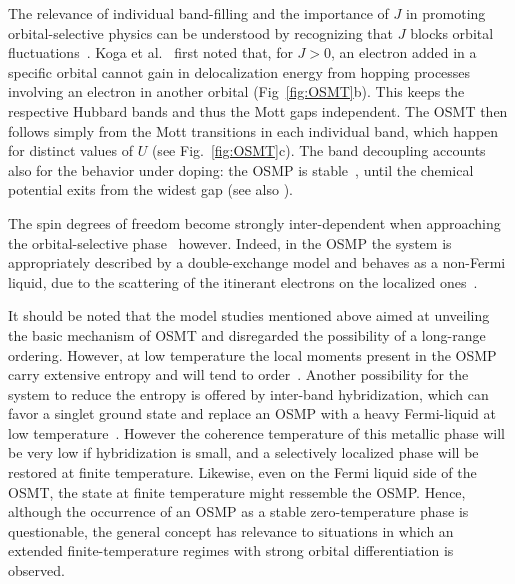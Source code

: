 \documentclass[]{ar2e-changed}%
\begin{document}
The relevance of individual band-filling and the importance of $J$ in promoting orbital-selective physics can be understood by recognizing that 
$J$ blocks orbital fluctuations~\cite{Koga_OSMT,Koga_OSMT_2005,demedici_3bandOSMT}. 
Koga et al.~\cite{Koga_OSMT,Koga_OSMT_2005} first noted that, for $J>0$, 
an electron added in a specific orbital cannot gain in delocalization energy
from hopping processes involving an electron in another orbital 
(Fig~\ref{fig:OSMT}b). This keeps the respective Hubbard bands and thus the Mott gaps independent. 
The OSMT then follows simply from the Mott
transitions in each individual band, which happen for distinct values of $U$ (see Fig.~\ref{fig:OSMT}c). 
%
The band decoupling accounts also for the behavior under doping: the OSMP
is stable~\cite{demedici_3bandOSMT,werner07_hilowspin}, until the
chemical potential exits from the widest gap (see also
\cite{Koga_OSMT,Inaba_dopedOSMT,Jakobi_dopedOSMT}).

% 
The spin degrees of freedom become strongly 
inter-dependent when approaching the orbital-selective phase~\cite{greger12} however. 
Indeed, in the OSMP the system is appropriately described by a
double-exchange model and behaves as a non-Fermi liquid, due to the
scattering of the itinerant electrons on the localized
ones~\cite{Biermann_nfl, Costi_Liebsch_nFL}.

It should be noted that the model studies mentioned above aimed at unveiling 
the basic mechanism of OSMT and disregarded the possibility of a long-range ordering. 
%
However, at low temperature the local moments present in the OSMP carry
extensive entropy and will tend to order~\cite{Koyama_magOSMT}.
%
Another possibility for the system to reduce the entropy is offered by
inter-band hybridization, which can favor a singlet ground state and
replace an OSMP with a heavy Fermi-liquid at low
temperature~\cite{demedici_Slave-spins, Koga_OSMT_2005,demedici_mottpam_2005}. 
%
However the coherence temperature of this metallic phase will be very low if 
hybridization is small, and a selectively localized phase will be restored at finite temperature.  Likewise, even on the Fermi liquid side of the OSMT, the state at finite temperature might ressemble the OSMP.
%
Hence, although the occurrence of an OSMP as a stable zero-temperature phase is 
questionable, the general concept has relevance to situations in which an extended 
finite-temperature regimes with strong orbital differentiation is observed. 
\end{document}
